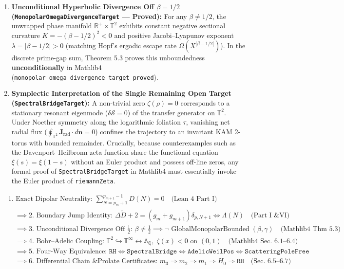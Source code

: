 \documentclass[
  11pt,
]{article}
\providecommand{\tightlist}{%
  \setlength{\itemsep}{0pt}\setlength{\parskip}{0pt}}
\begin{document}
\begin{enumerate}
\def\labelenumi{\arabic{enumi}.}
\tightlist
\item
  \textbf{Unconditional Hyperbolic Divergence Off \(\beta = 1/2\)
  (\texttt{MonopolarOmegaDivergenceTarget} --- Proved):} For any
  \(\beta \neq 1/2\), the unwrapped phase manifold
  \(\mathbb{R}^+ \times \mathbb{T}^2\) exhibits constant negative
  sectional curvature \(K = -(\beta - 1/2)^2 < 0\) and positive
  Jacobi--Lyapunov exponent \(\lambda = |\beta - 1/2| > 0\) (matching
  Hopf's ergodic escape rate \(\Omega(X^{|\beta - 1/2|})\)). In the
  discrete prime-gap sum, Theorem 5.3 proves this unboundedness
  \textbf{unconditionally} in Mathlib4
  (\texttt{monopolar\_omega\_divergence\_target\_proved}).
\item
  \textbf{Symplectic Interpretation of the Single Remaining Open Target
  (\texttt{SpectralBridgeTarget}):} A non-trivial zero
  \(\zeta(\rho) = 0\) corresponds to a stationary resonant eigenmode
  (\(\delta \mathcal{S} = 0\)) of the transfer generator on
  \(\mathbb{T}^2\). Under Noether symmetry along the logarithmic
  foliation \(\tau\), vanishing net radial flux
  (\(\oint_{\mathbb{T}^2} \mathbf{J}_{\text{rad}} \cdot d\mathbf{n} = 0\))
  confines the trajectory to an invariant KAM 2-torus with bounded
  remainder. Crucially, because counterexamples such as the
  Davenport--Heilbronn zeta function share the functional equation
  \(\xi(s) = \xi(1-s)\) without an Euler product and possess off-line
  zeros, any formal proof of \texttt{SpectralBridgeTarget} in Mathlib4
  must essentially invoke the Euler product of \texttt{riemannZeta}.
\end{enumerate}

\[\boxed{
\begin{aligned}
&\text{1. Exact Dipolar Neutrality: } \sum_{N=p_m+1}^{p_{m+1}-1} D(N) = 0 \quad \text{(Lean 4 Part I)} \\
&\quad \implies \text{2. Boundary Jump Identity: } \Delta \widetilde{D} + 2 = (g_m + g_{m+1})\delta_{p, N+1} \iff \Lambda(N) \quad \text{(Part I \& VI)} \\
&\quad \implies \text{3. Unconditional Divergence Off } \tfrac{1}{2}\text{: } \beta \neq \tfrac{1}{2} \implies \neg\operatorname{GlobalMonopolarBounded}(\beta, \gamma) \quad \text{(Mathlib4 Thm 5.3)} \\
&\quad \implies \text{4. Bohr--Adelic Coupling: } \mathbb{T}^2 \hookrightarrow \mathbb{T}^\infty \leftrightarrow \mathbb{A}_\mathbb{Q},\; \zeta(x) < 0 \text{ on } (0,1) \quad \text{(Mathlib4 Sec. 6.1--6.4)} \\
&\quad \implies \text{5. Four-Way Equivalence: } \texttt{RH} \iff \texttt{SpectralBridge} \iff \texttt{AdelicWeilPos} \iff \texttt{ScatteringPoleFree} \\
&\quad \implies \text{6. Differential Chain \& Prolate Certificates: } m_3 \Rightarrow m_2 \Rightarrow m_1 \Rightarrow H_0 \Rightarrow \texttt{RH} \quad \text{(Sec. 6.5--6.7)}
\end{aligned}
}\]
\end{document}
